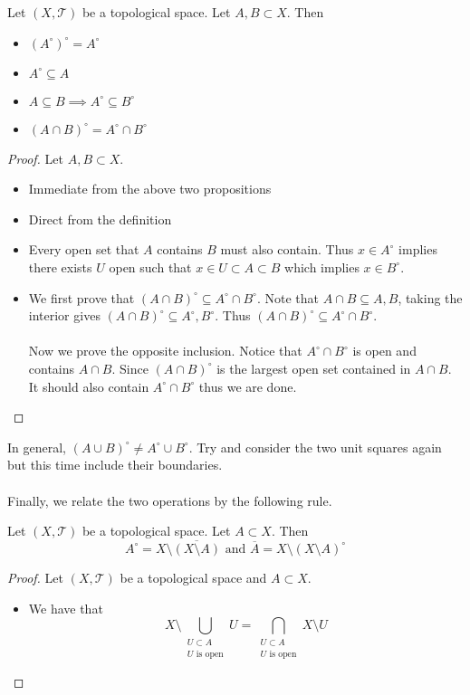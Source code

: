 \begin{prp}{}{} Let $(X,\mathcal{T})$ be a topological space. Let $A,B\subset X$. Then
\begin{itemize}
\item $(A^\circ)^\circ=A^\circ$
\item $A^\circ\subseteq A$
\item $A\subseteq B\implies A^\circ\subseteq B^\circ$
\item $(A\cap B)^\circ=A^\circ\cap B^\circ$
\end{itemize}\tcbline
\begin{proof} Let $A,B\subset X$. 
\begin{itemize}
\item Immediate from the above two propositions
\item Direct from the definition
\item Every open set that $A$ contains $B$ must also contain. Thus $x\in A^\circ$ implies there exists $U$ open such that $x\in U\subset A\subset B$ which implies $x\in B^\circ$. 
\item We first prove that $(A\cap B)^\circ\subseteq A^\circ\cap B^\circ$. Note that $A\cap B\subseteq A,B$, taking the interior gives $(A\cap B)^\circ\subseteq A^\circ,B^\circ$. Thus $(A\cap B)^\circ\subseteq A^\circ\cap B^\circ$. \\~\\
Now we prove the opposite inclusion. Notice that $A^\circ\cap B^\circ$ is open and contains $A\cap B$. Since $(A\cap B)^\circ$ is the largest open set contained in $A\cap B$. It should also contain $A^\circ\cap B^\circ$ thus we are done. 
\end{itemize}
\end{proof}
\end{prp}

In general, $(A\cup B)^\circ\neq A^\circ\cup B^\circ$. Try and consider the two unit squares again but this time include their boundaries. \\~\\
Finally, we relate the two operations by the following rule. 

\begin{prp}{}{} Let $(X,\mathcal{T})$ be a topological space. Let $A\subset X$. Then $$A^\circ=X\setminus\overline{(X\setminus A)}\text{ and }\overline{A}=X\setminus(X\setminus A)^\circ$$ \tcbline
\begin{proof}
Let $(X,\mathcal{T})$ be a topological space and $A\subset X$. 
\begin{itemize}
\item We have that $$X\setminus\bigcup_{\substack{U\subset A\\U\text{ is open}}}U=\bigcap_{\substack{U\subset A\\U\text{ is open}}}X\setminus U$$
\end{itemize}
\end{proof}
\end{prp}

